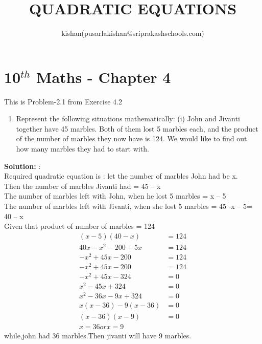 \documentclass[10pt]{article}
\title{QUADRATIC EQUATIONS}
\author{kishan(pusarlakishan@sriprakashschools.com)}
\newcommand{\solution}{\noindent \textbf{Solution: }}
\begin{document}
    \maketitle
    \section*{10$^{th}$ Maths - Chapter 4}
    This is Problem-2.1 from Exercise 4.2
\begin{enumerate}
    \item Represent the following situations mathematically:
(i) John and Jivanti together have 45 marbles. Both of them lost 5 marbles each, and
the product of the number of marbles they now have is 124. We would like to find
out how many marbles they had to start with.
\end{enumerate}
\solution:\\Required quadratic equation is :
let the number of marbles John had be x.\\
Then the number of marbles Jivanti had = 45 – x \\
The number of marbles left with John, when he lost 5 marbles = x – 5\\
The number of marbles left with Jivanti, when she lost 5 marbles = 45 -x – 5= 40 – x\\
Given that product of number of marbles = 124\\
\begin{align}
(x-5)(40-x) &=124\\
40x-x^2-200+5x &= 124\\
-x^2+45x-200 &= 124\\
-x^2+45x-200 &= 124 \\
-x^2+45x-324 &= 0\\
x^2-45x+324 &= 0\\
x^2-36x-9x+324 &= 0\\
x(x-36)-9(x-36)&=0\\
(x-36)(x-9)&=0\\
x=36 or x=9
\end{align}
while,john had 36 marbles.Then jivanti will have 9 marbles.
\end{document}
